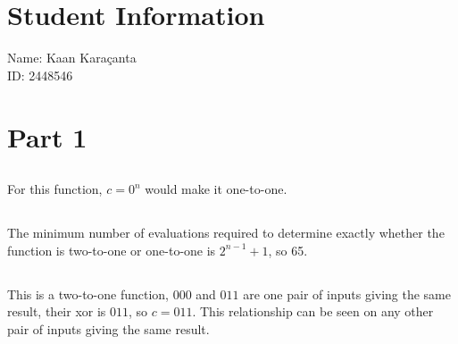 \documentclass[12pt]{article}
\begin{document}
\section*{Student Information}

Name: Kaan Karaçanta \\

ID: 2448546 \\

\section*{Part 1}

\subsection*{}

For this function, $ c = 0^n $ would make it one-to-one.

\subsection*{}

The minimum number of evaluations required to determine exactly whether the function is two-to-one or one-to-one is $ 2^{n-1} + 1 $, so 65. 

\subsection*{}

This is a two-to-one function, $ 000 $ and $ 011 $ are one pair of inputs giving the same result, their xor is $ 011 $, so $ c = 011 $. This relationship can be seen on any other pair of inputs giving the same result.

\end{document}
